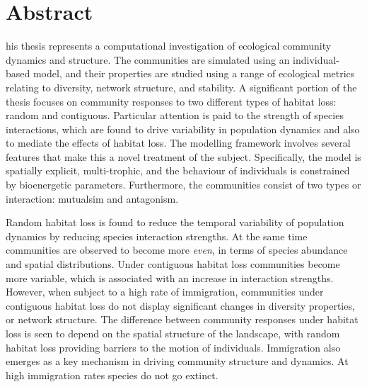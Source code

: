 %
%
%

\chapter*{Abstract}
\begin{SingleSpace}
his thesis represents a computational investigation of ecological community dynamics and structure. The communities are simulated using an individual-based model, and their properties are studied using a range of ecological metrics relating to diversity, network structure, and stability. A significant portion of the thesis focuses on community responses to two different types of habitat loss: random and contiguous. Particular attention is paid to the strength of species interactions, which are found to drive variability in population dynamics and also to mediate the effects of habitat loss. The modelling framework involves several features that make this a novel treatment of the subject. Specifically, the model is spatially explicit, multi-trophic, and the behaviour of individuals is constrained by bioenergetic parameters. Furthermore, the communities consist of two types or interaction: mutualsim and antagonism. 


Random habitat loss is found to reduce the temporal variability of population dynamics by reducing species interaction strengths. At the same time communities are observed to become more \emph{even}, in terms of species abundance and spatial distributions. Under contiguous habitat loss communities become more variable, which is associated with an increase in interaction strengths. However, when subject to a high rate of immigration, communities under contiguous habitat loss do not display significant changes in diversity properties, or network structure.  The difference between community responses under habitat loss is seen to depend on the spatial structure of the landscape, with random habitat loss providing barriers to the motion of individuals. Immigration also emerges as a key mechanism in driving community structure and dynamics. At high immigration rates species do not go extinct.


\end{SingleSpace}
